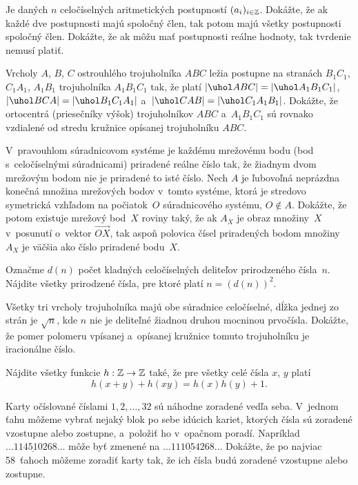 {%
Je daných $n$ celočíselných aritmetických postupností $(a_i)_{i \in {\Bbb
Z}}$. Dokážte, že ak každé dve postupnosti majú spoločný člen, tak potom
majú všetky postupnosti spoločný člen. Dokážte, že ak môžu mať postupnosti
reálne hodnoty, tak tvrdenie nemusí platiť.}

{%
Vrcholy $A$, $B$, $C$ ostrouhlého trojuholníka $ABC$ ležia postupne na
stranách  $B_1C_1$, $C_1A_1$, $A_1B_1$ trojuholníka
$A_1B_1C_1$ tak, že platí
$|\uhol ABC| = |\uhol A_1B_1C_1|$,
$|\uhol BCA| = |\uhol B_1C_1A_1|$ a~$|\uhol CAB| = |\uhol C_1A_1B_1|$.
Dokážte, že ortocentrá (priesečníky výšok) trojuholníkov $ABC$ a~$A_1B_1C_1$
sú rovnako vzdialené od stredu kružnice opísanej trojuholníku $ABC$.}

{%
V~pravouhlom súradnicovom systéme je každému mrežovému bodu (bod s~celočíselnými súradnicami)
priradené reálne číslo tak, že žiadnym dvom mrežovým bodom nie je priradené to
isté číslo. Nech $A$ je ľubovoľná neprázdna konečná množina mrežových
bodov v~tomto systéme, ktorá je stredovo symetrická
vzhľadom na počiatok~$O$ súradnicového systému, $O\notin A$.
Dokážte, že potom existuje mrežový bod~$X$ roviny taký, že ak
$A_X$ je obraz množiny~$X$ v~posunutí o~vektor $\overrightarrow{OX}$, tak
aspoň
polovica čísel priradených bodom množiny~$A_X$ je väčšia ako číslo priradené
bodu~$X$.}

{%
Označme $d(n)$ počet kladných celočíselných deliteľov prirodzeného čísla~$n$.
Nájdite všetky prirodzené čísla, pre ktoré platí
$n = (d(n))^2$.}

{%
Všetky tri vrcholy trojuholníka majú obe súradnice celočíselné, dĺžka jednej zo
 strán je $\sqrt{n}$, kde $n$ nie je deliteľné žiadnou druhou mocninou
 prvočísla.
Dokážte, že pomer polomeru vpísanej a~opísanej kružnice tomuto trojuholníku je
iracionálne číslo.}

{%
Nájdite všetky funkcie
$ h : \Bbb Z \to \Bbb Z $
také, že pre všetky celé čísla $x$, $y$ platí
$$
  h(x+y) + h(xy) = h(x) h(y) + 1 .
$$}

{%
Karty očíslované číslami $1,2,\dots,32$ sú náhodne zoradené vedľa seba.
V~jednom ťahu môžeme vybrať nejaký blok po sebe idúcich kariet, ktorých
čísla sú zoradené vzostupne alebo zostupne, a~položiť ho v~opačnom poradí.
Napríklad
$\dots 11 \underline{4 5 10} 26 8 \dots$
môže byť zmenené na
$\dots 11 \underline{10 5 4} 26 8 \dots$
Dokážte, že po najviac 58~ťahoch môžeme zoradiť karty tak, že ich čísla
budú zoradené vzostupne alebo zostupne.}

